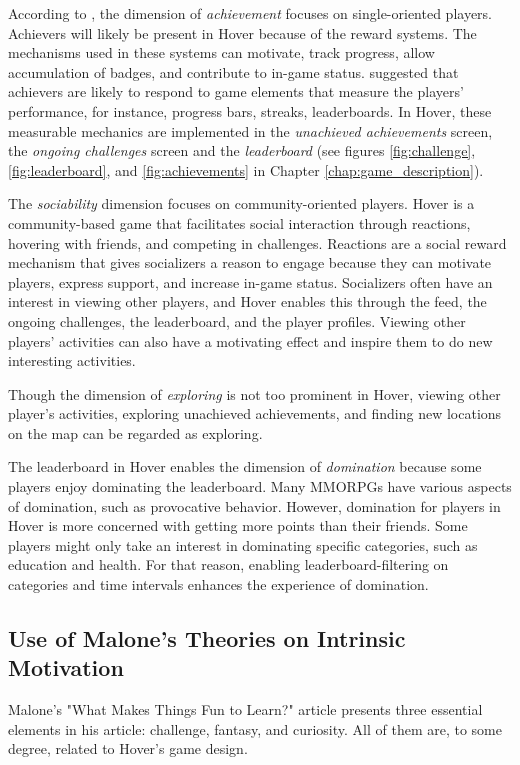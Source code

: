 According to \citet{hamari_player_2014}, the dimension of \textit{achievement} focuses on single-oriented players. Achievers will likely be present in Hover because of the reward systems. The mechanisms used in these systems can motivate, track progress, allow accumulation of badges, and contribute to in-game status. \citet{yee_motivations_2007} suggested that achievers are likely to respond to game elements that measure the players’ performance, for instance, progress bars, streaks, leaderboards. In Hover, these measurable mechanics are implemented in the \textit{unachieved achievements} screen, the \textit{ongoing challenges} screen and the \textit{leaderboard} (see figures \ref{fig:challenge}, \ref{fig:leaderboard}, and \ref{fig:achievements} in Chapter \ref{chap:game_description}).
    
The \textit{sociability} dimension focuses on community-oriented players. Hover is a community-based game that facilitates social interaction through reactions, hovering with friends, and competing in challenges. Reactions are a social reward mechanism that gives socializers a reason to engage because they can motivate players, express support, and increase in-game status. Socializers often have an interest in viewing other players, and Hover enables this through the feed, the ongoing challenges, the leaderboard, and the player profiles. Viewing other players’ activities can also have a motivating effect and inspire them to do new interesting activities. 

Though the dimension of \textit{exploring} is not too prominent in Hover, viewing other player’s activities, exploring unachieved achievements, and finding new locations on the map can be regarded as exploring.

The leaderboard in Hover enables the dimension of \textit{domination} because some players enjoy dominating the leaderboard. Many MMORPGs have various aspects of domination, such as provocative behavior. However, domination for players in Hover is more concerned with getting more points than their friends. Some players might only take an interest in dominating specific categories, such as education and health. For that reason, enabling leaderboard-filtering on categories and time intervals enhances the experience of domination.

\subsection{Use of Malone’s Theories on Intrinsic Motivation}
Malone’s "What Makes Things Fun to Learn?" article presents three essential elements in his article: challenge, fantasy, and curiosity. All of them are, to some degree, related to Hover’s game design.

